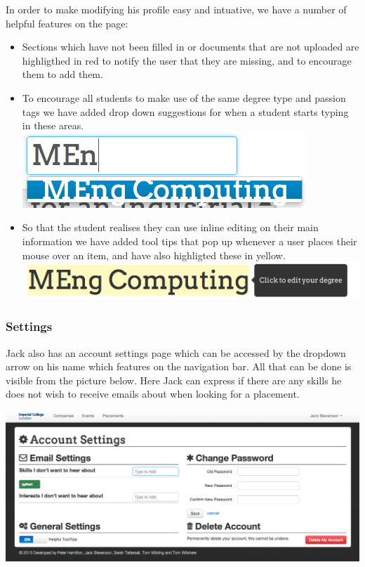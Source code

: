     In order to make modifying his profile easy and intuative, we have a number of helpful features on the page:
    \begin{itemize}
      \item Sections which have not been filled in or documents that are not uploaded are highligthed in red to notify the user that they are missing, and to encourage them to add them.
      \item To encourage all students to make use of the same degree type and passion tags we have added drop down suggestions for when a student starts typing in these areas.
      \includegraphics[scale=0.5]{images/user_experiences/student/edit_suggestions}
      \item So that the student realises they can use inline editing on their main information we have added tool tips that pop up whenever a user places their mouse over an item, and have also highligted these in yellow.
      \includegraphics[scale=0.5]{images/user_experiences/student/edit_degree_tooltip}
    \end{itemize} 

  \subsubsection{Settings}
    Jack also has an account settings page which can be accessed by the dropdown arrow on his name which features on the navigation bar. All that can be done is visible from the picture below. Here Jack can express if there are any skills he does not wish to receive emails about when looking for a placement.

    \includegraphics[scale=0.3]{images/user_experiences/student/account_settings}

